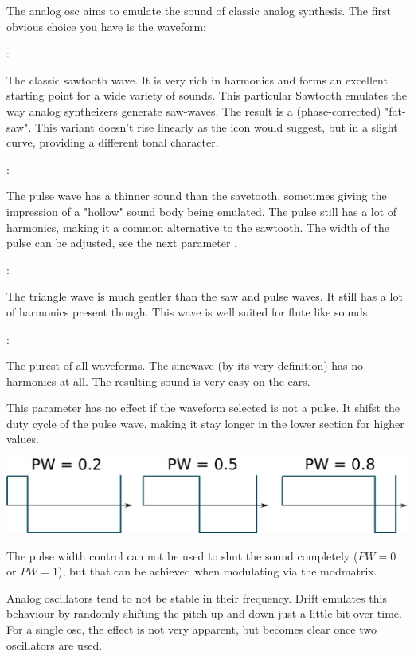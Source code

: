 The analog osc aims to emulate the sound of classic analog synthesis. The first obvious choice you have is the waveform:

{

:

The classic sawtooth wave. It is very rich in harmonics and forms an excellent starting point for a wide variety of sounds. This particular Sawtooth emulates the way analog syntheizers generate saw-waves. The result is a (phase-corrected) "fat-saw". This variant doesn't rise linearly as the icon would suggest, but in a slight curve, providing a different tonal character.

:

The pulse wave has a thinner sound than the savetooth, sometimes giving the impression of a "hollow" sound body being emulated. The pulse still has a lot of harmonics, making it a common alternative to the sawtooth. The width of the pulse can be adjusted, see the next parameter .

:

The triangle wave is much gentler than the saw and pulse waves. It still has a lot of harmonics present though. This wave is well suited for flute like sounds.

:

The purest of all waveforms. The sinewave (by its very definition) has no harmonics at all. The resulting sound is very easy on the ears.}

{This parameter has no effect if the waveform selected is not a pulse. It shifst the duty cycle of the pulse wave, making it stay longer in the lower section for higher values.

\begin{center}
    \includegraphics[width=\textwidth]{graphics/PWM.png}
\end{center}

The pulse width control can not be used to shut the sound completely ($PW = 0$ or $PW = 1$), but that can be achieved when modulating via the modmatrix.}

{Analog oscillators tend to not be stable in their frequency. Drift emulates this behaviour by randomly shifting the pitch up and down just a little bit over time. For a single osc, the effect is not very apparent, but becomes clear once two oscillators are used.}

